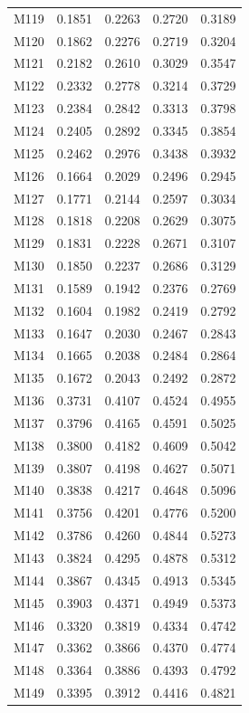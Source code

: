 \begin{longtable}{lrrrr}
M119 & 0.1851 & 0.2263 & 0.2720 & 0.3189 \\
M120 & 0.1862 & 0.2276 & 0.2719 & 0.3204 \\
M121 & 0.2182 & 0.2610 & 0.3029 & 0.3547 \\
M122 & 0.2332 & 0.2778 & 0.3214 & 0.3729 \\
M123 & 0.2384 & 0.2842 & 0.3313 & 0.3798 \\
M124 & 0.2405 & 0.2892 & 0.3345 & 0.3854 \\
M125 & 0.2462 & 0.2976 & 0.3438 & 0.3932 \\
M126 & 0.1664 & 0.2029 & 0.2496 & 0.2945 \\
M127 & 0.1771 & 0.2144 & 0.2597 & 0.3034 \\
M128 & 0.1818 & 0.2208 & 0.2629 & 0.3075 \\
M129 & 0.1831 & 0.2228 & 0.2671 & 0.3107 \\
M130 & 0.1850 & 0.2237 & 0.2686 & 0.3129 \\
M131 & 0.1589 & 0.1942 & 0.2376 & 0.2769 \\
M132 & 0.1604 & 0.1982 & 0.2419 & 0.2792 \\
M133 & 0.1647 & 0.2030 & 0.2467 & 0.2843 \\
M134 & 0.1665 & 0.2038 & 0.2484 & 0.2864 \\
M135 & 0.1672 & 0.2043 & 0.2492 & 0.2872 \\
M136 & 0.3731 & 0.4107 & 0.4524 & 0.4955 \\
M137 & 0.3796 & 0.4165 & 0.4591 & 0.5025 \\
M138 & 0.3800 & 0.4182 & 0.4609 & 0.5042 \\
M139 & 0.3807 & 0.4198 & 0.4627 & 0.5071 \\
M140 & 0.3838 & 0.4217 & 0.4648 & 0.5096 \\
M141 & 0.3756 & 0.4201 & 0.4776 & 0.5200 \\
M142 & 0.3786 & 0.4260 & 0.4844 & 0.5273 \\
M143 & 0.3824 & 0.4295 & 0.4878 & 0.5312 \\
M144 & 0.3867 & 0.4345 & 0.4913 & 0.5345 \\
M145 & 0.3903 & 0.4371 & 0.4949 & 0.5373 \\
M146 & 0.3320 & 0.3819 & 0.4334 & 0.4742 \\
M147 & 0.3362 & 0.3866 & 0.4370 & 0.4774 \\
M148 & 0.3364 & 0.3886 & 0.4393 & 0.4792 \\
M149 & 0.3395 & 0.3912 & 0.4416 & 0.4821 \\

\end{longtable}
